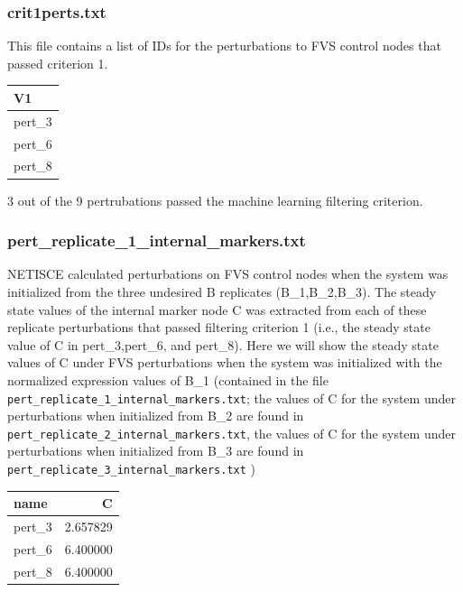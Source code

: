 \documentclass[
]{book}
\begin{document}
\hypertarget{section-id}{%
\subsubsection*{crit1perts.txt}\label{section-id}}

This file contains a list of IDs for the perturbations to FVS control nodes that passed criterion 1.

\begin{tabular}{l}
\hline
V1\\
\hline
pert\_3\\
\hline
pert\_6\\
\hline
pert\_8\\
\hline
\end{tabular}

3 out of the 9 pertrubations passed the machine learning filtering criterion.

\hypertarget{section-id}{%
\subsubsection*{pert\_replicate\_1\_internal\_markers.txt}\label{section-id}}

NETISCE calculated perturbations on FVS control nodes when the system was initialized from the three undesired B replicates (B\_1,B\_2,B\_3). The steady state values of the internal marker node C was extracted from each of these replicate perturbations that passed filtering criterion 1 (i.e., the steady state value of C in pert\_3,pert\_6, and pert\_8). Here we will show the steady state values of C under FVS perturbations when the system was initialized with the normalized expression values of B\_1 (contained in the file \texttt{pert\_replicate\_1\_internal\_markers.txt}; the values of C for the system under perturbations when initialized from B\_2 are found in \texttt{pert\_replicate\_2\_internal\_markers.txt}, the values of C for the system under perturbations when initialized from B\_3 are found in \texttt{pert\_replicate\_3\_internal\_markers.txt} )

\begin{tabular}{l|r}
\hline
name & C\\
\hline
pert\_3 & 2.657829\\
\hline
pert\_6 & 6.400000\\
\hline
pert\_8 & 6.400000\\
\hline
\end{tabular}
\end{document}

